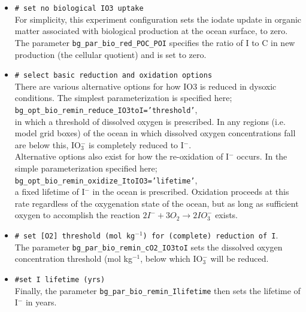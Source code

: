 \begin{itemize}[noitemsep]

\vspace{1mm}
        \item \texttt{\# set no biological IO3 uptake}
        \\ For simplicity, this experiment configuration sets the iodate update in organic matter associated with biological production at the ocean surface, to zero. The parameter \texttt{bg\_par\_bio\_red\_POC\_POI} specifies the ratio of I to C in new production (the cellular quotient) and is set to zero.

\vspace{1mm}
        \item \texttt{\# select basic reduction and oxidation options}
        \\ There are various alternative options for how IO3 is reduced in dysoxic conditions. The simplest parameterization is specified here;
\\ \texttt{bg\_opt\_bio\_remin\_reduce\_IO3toI='threshold'},
\\ in which a threshold of dissolved oxygen is prescribed. In any regions (i.e. model grid boxes) of the ocean in which dissolved oxygen concentrations fall are below this, IO\(^{-}_{3}\) is completely reduced to I\(^{-}\).
\\ Alternative options also exist for how the re-oxidation of I\(^{-}\) occurs. In the simple parameterization specified here;
\\ \texttt{bg\_opt\_bio\_remin\_oxidize\_ItoIO3='lifetime'},
\\ a fixed lifetime of I\(^{-}\) in the ocean is prescribed. Oxidation proceeds at this rate regardless of the oxygenation state of the ocean, but as long as sufficient oxygen to accomplish the reaction \(2I^{-} + 3O_{2} \rightarrow 2IO^{-}_{3}\) exists.

\vspace{1mm}
        \item \texttt{\# set [O2] threshold (mol kg\(^{-1}\)) for (complete) reduction of I}.
\\ The parameter \texttt{bg\_par\_bio\_remin\_cO2\_IO3toI} sets the dissolved oxygen concentration threshold (mol kg\(^{-1}\), below which IO\(^{-}_{3}\) will be reduced.

\vspace{1mm}
        \item \texttt{\#set I lifetime (yrs)}
        \\ Finally, the parameter \texttt{bg\_par\_bio\_remin\_Ilifetime} then sets the lifetime of I\(^{-}\) in years.

\end{itemize}
\vspace{1mm}

